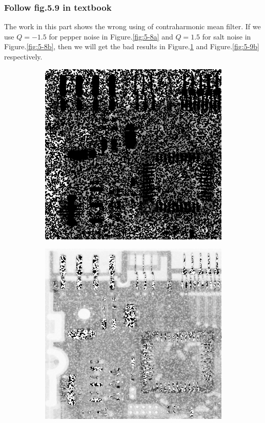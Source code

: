 \subsubsection{Follow fig.5.9 in textbook}
The work in this part shows the wrong using of contraharmonic mean filter. If we use $Q=-1.5$ for pepper noise in Figure.\ref{fig:5-8a} and $Q=1.5$ for salt noise in Figure.\ref{fig:5-8b}, then we will get the bad results in Figure.\ref{fig:5-9a} and Figure.\ref{fig:5-9b} respectively.
\begin{figure}[h]
	\centering
	\begin{subfigure}[b]{0.4\linewidth}
		\includegraphics[width=\linewidth]{myfigure/p4/42-pepper-contraharmo_bad.png}
		\caption{}
		\label{fig:5-9a}
	\end{subfigure}
	\begin{subfigure}[b]{0.4\linewidth}
		\includegraphics[width=\linewidth]{myfigure/p4/42-salt-contraharmo_bad.png}

\end{subfigure}
\end{figure}
